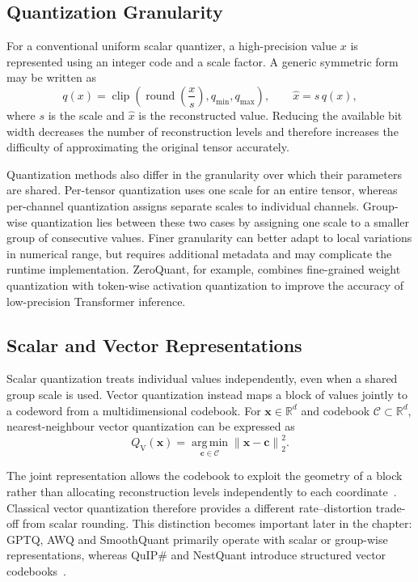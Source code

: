 \subsection{Quantization Granularity}
For a conventional uniform scalar quantizer, a high-precision value
\(x\) is represented using an integer code and a scale factor. A generic
symmetric form may be written as
\begin{equation}
q(x)
=
\operatorname{clip}
\left(
\operatorname{round}\left(\frac{x}{s}\right),
q_{\min},q_{\max}
\right),
\qquad
\hat{x}=s\,q(x),
\label{eq:generic-scalar-quantizer}
\end{equation}
where \(s\) is the scale and \(\hat{x}\) is the reconstructed value.
Reducing the available bit width decreases the number of reconstruction
levels and therefore increases the difficulty of approximating the
original tensor accurately.

Quantization methods also differ in the granularity over which their
parameters are shared. Per-tensor quantization uses one scale for an
entire tensor, whereas per-channel quantization assigns separate scales
to individual channels. Group-wise quantization lies between these two
cases by assigning one scale to a smaller group of consecutive values.
Finer granularity can better adapt to local variations in numerical
range, but requires additional metadata and may complicate the runtime
implementation. ZeroQuant, for example, combines fine-grained weight
quantization with token-wise activation quantization to improve the
accuracy of low-precision Transformer inference\cite{yao2022zeroquantefficientaffordableposttraining}.

\subsection{Scalar and Vector Representations}
Scalar quantization treats individual values independently, even when a
shared group scale is used. Vector quantization instead maps a block of
values jointly to a codeword from a multidimensional codebook. For
\(\mathbf{x}\in\mathbb{R}^{d}\) and codebook
\(\mathcal{C}\subset\mathbb{R}^{d}\), nearest-neighbour vector
quantization can be expressed as
\begin{equation}
Q_{\mathrm{V}}(\mathbf{x})
=
\underset{\mathbf{c}\in\mathcal{C}}
{\operatorname{arg\,min}}
\left\|
\mathbf{x}-\mathbf{c}
\right\|_{2}^{2}.
\label{eq:vector-quantization-ch2}
\end{equation}

The joint representation allows the codebook to exploit the geometry of
a block rather than allocating reconstruction levels independently to
each coordinate~\cite{1094577}. Classical vector quantization therefore provides a
different rate--distortion trade-off from scalar rounding. This distinction becomes important later in the chapter: \ac{GPTQ}, AWQ and SmoothQuant primarily operate with scalar or group-wise representations, whereas QuIP\# and NestQuant introduce structured vector
codebooks~\cite{tseng2024quipbetterllmquantization,savkin2025nestquantnestedlatticequantization}.


